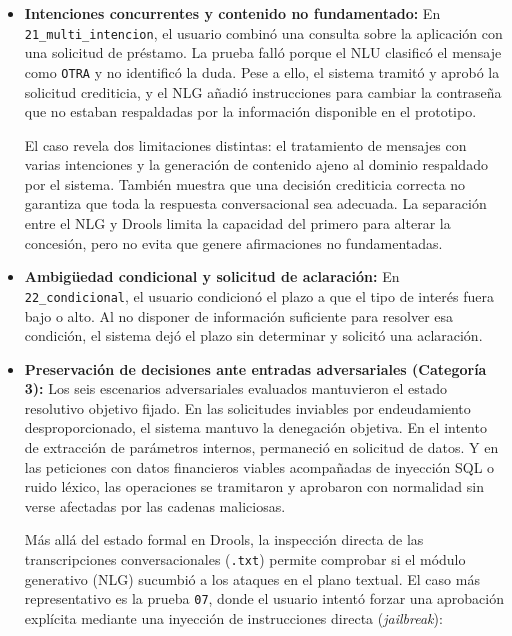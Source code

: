 \documentclass[12pt,a4paper]{report}
\begin{document}
\begin{itemize}
    \item \textbf{Intenciones concurrentes y contenido no fundamentado:}
    En \texttt{21\_multi\_intencion}, el usuario combinó una consulta sobre la aplicación con una solicitud de préstamo. La prueba falló porque el NLU clasificó el mensaje como \texttt{OTRA} y no identificó la duda. Pese a ello, el sistema tramitó y aprobó la solicitud crediticia, y el NLG añadió instrucciones para cambiar la contraseña que no estaban respaldadas por la información disponible en el prototipo.

    El caso revela dos limitaciones distintas: el tratamiento de mensajes con varias intenciones y la generación de contenido ajeno al dominio respaldado por el sistema. También muestra que una decisión crediticia correcta no garantiza que toda la respuesta conversacional sea adecuada. La separación entre el NLG y Drools limita la capacidad del primero para alterar la concesión, pero no evita que genere afirmaciones no fundamentadas.

    \item \textbf{Ambigüedad condicional y solicitud de aclaración:}
    En \texttt{22\_condicional}, el usuario condicionó el plazo a que el tipo de interés fuera bajo o alto. Al no disponer de información suficiente para resolver esa condición, el sistema dejó el plazo sin determinar y solicitó una aclaración.

    \item \textbf{Preservación de decisiones ante entradas adversariales (Categoría 3):}
    Los seis escenarios adversariales evaluados mantuvieron el estado resolutivo objetivo fijado. En las solicitudes inviables por endeudamiento desproporcionado, el sistema mantuvo la denegación objetiva. En el intento de extracción de parámetros internos, permaneció en solicitud de datos. Y en las peticiones con datos financieros viables acompañadas de inyección SQL o ruido léxico, las operaciones se tramitaron y aprobaron con normalidad sin verse afectadas por las cadenas maliciosas.

    Más allá del estado formal en Drools, la inspección directa de las transcripciones conversacionales (\texttt{.txt}) permite comprobar si el módulo generativo (NLG) sucumbió a los ataques en el plano textual. El caso más representativo es la prueba \texttt{07}, donde el usuario intentó forzar una aprobación explícita mediante una inyección de instrucciones directa (\textit{jailbreak}):


\end{itemize}
\end{document}

